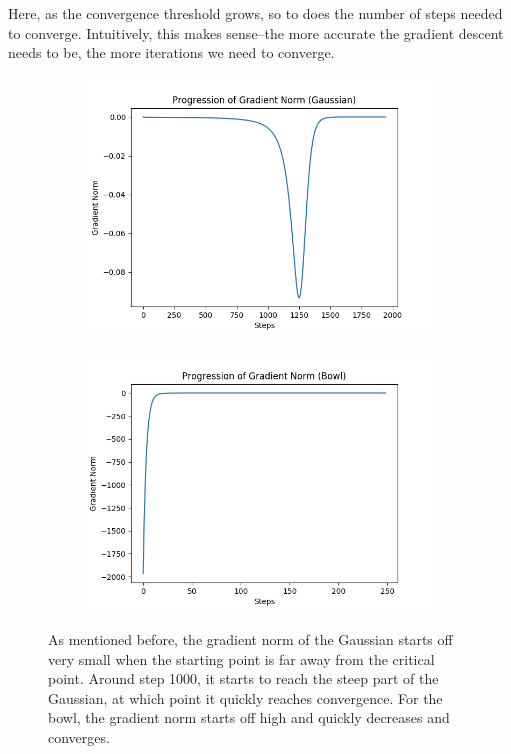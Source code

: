 \documentclass[8pt]{article}
\begin{document}
%
Here, as the convergence threshold grows, so to does the number of steps needed to converge. Intuitively, this makes sense--the more accurate the gradient descent needs to be, the more iterations we need to converge.
%
\begin{figure}[H]
\centering
        \begin{subfigure}[b]{0.4\textwidth}
                \includegraphics[width=\linewidth]{../P1/figs/grad_norm_gauss.png}
        \end{subfigure}%
        \begin{subfigure}[b]{0.4\textwidth}
                \includegraphics[width=\linewidth]{../P1/figs/grad_norm_bowl.png}
        \end{subfigure}%
\caption*{As mentioned before, the gradient norm of the Gaussian starts off very small when the starting point is far away from the critical point. Around step 1000, it starts to reach the steep part of the Gaussian, at which point it quickly reaches convergence. For the bowl, the gradient norm starts off high and quickly decreases and converges.}
\end{figure}
\end{document}
